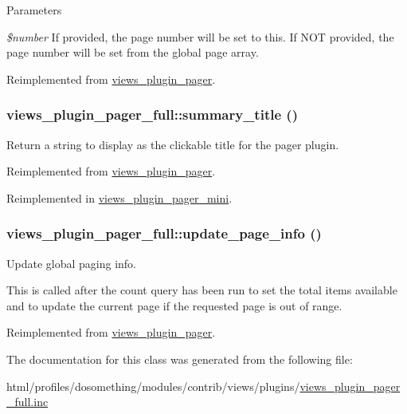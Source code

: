 \begin{DoxyParams}{Parameters}
\item[{\em \$number}]If provided, the page number will be set to this. If NOT provided, the page number will be set from the global page array. \end{DoxyParams}


Reimplemented from \hyperlink{classviews__plugin__pager_ab79949456c53589c17ca262732aabf4b}{views\_\-plugin\_\-pager}.\hypertarget{classviews__plugin__pager__full_af727d597c4029f7f11721871f7b9c839}{
\subsubsection[{summary\_\-title}]{\setlength{\rightskip}{0pt plus 5cm}views\_\-plugin\_\-pager\_\-full::summary\_\-title ()}}
\label{classviews__plugin__pager__full_af727d597c4029f7f11721871f7b9c839}
Return a string to display as the clickable title for the pager plugin. 

Reimplemented from \hyperlink{classviews__plugin__pager_a12df2a012d53b9276a14fae94511f686}{views\_\-plugin\_\-pager}.

Reimplemented in \hyperlink{classviews__plugin__pager__mini_af95c2913ea9b9db423fb0761e543ea09}{views\_\-plugin\_\-pager\_\-mini}.\hypertarget{classviews__plugin__pager__full_acb15b273f383e8cad63658d4dec52db0}{
\subsubsection[{update\_\-page\_\-info}]{\setlength{\rightskip}{0pt plus 5cm}views\_\-plugin\_\-pager\_\-full::update\_\-page\_\-info ()}}
\label{classviews__plugin__pager__full_acb15b273f383e8cad63658d4dec52db0}
Update global paging info.

This is called after the count query has been run to set the total items available and to update the current page if the requested page is out of range. 

Reimplemented from \hyperlink{classviews__plugin__pager_ab4ecbd01ed64c4a6c0079410d8b4dddc}{views\_\-plugin\_\-pager}.

The documentation for this class was generated from the following file:\begin{DoxyCompactItemize}
\item 
html/profiles/dosomething/modules/contrib/views/plugins/\hyperlink{views__plugin__pager__full_8inc}{views\_\-plugin\_\-pager\_\-full.inc}\end{DoxyCompactItemize}
